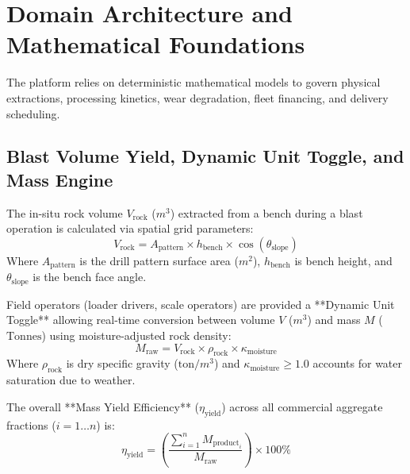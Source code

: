 \documentclass[11pt, a4paper]{article}
\begin{document}
\section{Domain Architecture and Mathematical Foundations}

The platform relies on deterministic mathematical models to govern physical extractions, processing kinetics, wear degradation, fleet financing, and delivery scheduling.

\subsection{Blast Volume Yield, Dynamic Unit Toggle, and Mass Engine}
The in-situ rock volume $V_{\text{rock}}$ ($m^3$) extracted from a bench during a blast operation is calculated via spatial grid parameters:
\begin{equation}
    V_{\text{rock}} = A_{\text{pattern}} \times h_{\text{bench}} \times \cos(\theta_{\text{slope}})
\end{equation}
Where $A_{\text{pattern}}$ is the drill pattern surface area ($m^2$), $h_{\text{bench}}$ is bench height, and $\theta_{\text{slope}}$ is the bench face angle.

Field operators (loader drivers, scale operators) are provided a **Dynamic Unit Toggle** allowing real-time conversion between volume $V$ ($m^3$) and mass $M$ ($\text{Tonnes}$) using moisture-adjusted rock density:
\begin{equation}
    M_{\text{raw}} = V_{\text{rock}} \times \rho_{\text{rock}} \times \kappa_{\text{moisture}}
\end{equation}
Where $\rho_{\text{rock}}$ is dry specific gravity ($\text{ton}/m^3$) and $\kappa_{\text{moisture}} \ge 1.0$ accounts for water saturation due to weather.

The overall **Mass Yield Efficiency** ($\eta_{\text{yield}}$) across all commercial aggregate fractions ($i = 1 \dots n$) is:
\begin{equation}
    \eta_{\text{yield}} = \left( \frac{\sum_{i=1}^{n} M_{\text{product}_i}}{M_{\text{raw}}} \right) \times 100\%
\end{equation}
\end{document}
